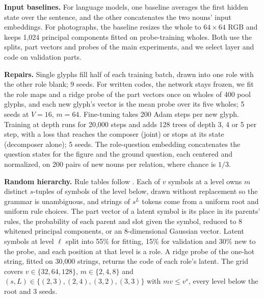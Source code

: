 \textbf{Input baselines.} For language models, one baseline averages the first hidden state over the sentence, and the other concatenates the two nouns' input embeddings. For photographs, the baseline resizes the whole to $64 \times 64$ RGB and keeps 1{,}024 principal components fitted on probe-training wholes. Both use the splits, part vectors and probes of the main experiments, and we select layer and code on validation parts.

\textbf{Repairs.} Single glyphs fill half of each training batch, drawn into one role with the other role blank; 9 seeds. For written codes, the network stays frozen, we fit the role maps and a ridge probe of the part vectors once on wholes of 400 pool glyphs, and each new glyph's vector is the mean probe over its five wholes; 5 seeds at $V = 16$, $m = 64$. Fine-tuning takes 200 Adam steps per new glyph. Training at depth runs for 20{,}000 steps and adds 128 trees of depth 3, 4 or 5 per step, with a loss that reaches the composer (joint) or stops at its state (decomposer alone); 5 seeds. The role-question embedding concatenates the question states for the figure and the ground question, each centered and normalized, on 200 pairs of new nouns per relation, where chance is $1/3$.

\textbf{Random hierarchy.} Rule tables follow \citet{cagnetta2024rhm}. Each of $v$ symbols at a level owns $m$ distinct $s$-tuples of symbols of the level below, drawn without replacement so the grammar is unambiguous, and strings of $s^L$ tokens come from a uniform root and uniform rule choices. The part vector of a latent symbol is its place in its parents' rules, the probability of each parent and slot given the symbol, reduced to 8 whitened principal components, or an 8-dimensional Gaussian vector. Latent symbols at level $\ell$ split into 55\% for fitting, 15\% for validation and 30\% new to the probe, and each position at that level is a role. A ridge probe of the one-hot string, fitted on 30{,}000 strings, returns the code of each role's latent. The grid covers $v \in \{32, 64, 128\}$, $m \in \{2, 4, 8\}$ and $(s, L) \in \{(2,3), (2,4), (3,2), (3,3)\}$ with $mv \le v^s$, every level below the root and 3 seeds.
